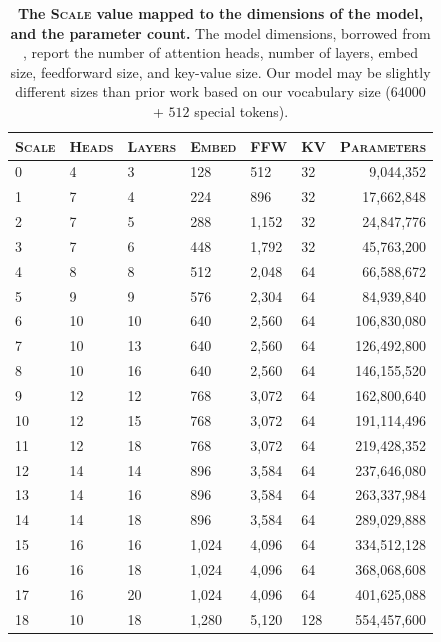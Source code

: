 \begin{table}
  \centering            %
  \scriptsize         %
  \setlength{\tabcolsep}{3pt}
\caption{\textbf{The \textsc{Scale} value mapped to the dimensions of the model, and the parameter count.}
The model dimensions, borrowed from \citet{muennighoff2024scaling}, report the number of attention heads, number of layers, embed size, feedforward size, and key-value size.
Our model may be slightly different sizes than prior work based on our vocabulary size ($64000$ + $512$ special tokens).
}
    \begin{tabular}{l|lllll|r}
      \toprule
      \textsc{Scale} & \textsc{Heads} & \textsc{Layers} & \textsc{Embed} & 
      \textsc{FFW} & \textsc{KV} & \textsc{Parameters}\\
      \midrule
0  & 4  & 3  & 128  & 512   & 32  & 9,044,352  \\
1  & 7  & 4  & 224  & 896   & 32  & 17,662,848 \\
2  & 7  & 5  & 288  & 1,152 & 32 & 24,847,776 \\
3  & 7  & 6  & 448  & 1,792 & 32 & 45,763,200 \\
4  & 8  & 8  & 512  & 2,048 & 64 & 66,588,672 \\
5  & 9  & 9  & 576  & 2,304 & 64 & 84,939,840 \\
6  & 10 & 10 & 640  & 2,560 & 64 & 106,830,080 \\
7  & 10 & 13 & 640  & 2,560 & 64 & 126,492,800 \\
8  & 10 & 16 & 640  & 2,560 & 64 & 146,155,520 \\
9  & 12 & 12 & 768  & 3,072 & 64 & 162,800,640 \\
10 & 12 & 15 & 768  & 3,072 & 64 & 191,114,496 \\
11 & 12 & 18 & 768  & 3,072 & 64 & 219,428,352 \\
12 & 14 & 14 & 896  & 3,584 & 64 & 237,646,080 \\
13 & 14 & 16 & 896  & 3,584 & 64 & 263,337,984 \\
14 & 14 & 18 & 896  & 3,584 & 64 & 289,029,888 \\
15 & 16 & 16 & 1,024 & 4,096 & 64 & 334,512,128 \\
16 & 16 & 18 & 1,024 & 4,096 & 64 & 368,068,608 \\
17 & 16 & 20 & 1,024 & 4,096 & 64 & 401,625,088 \\
18 & 10 & 18 & 1,280 & 5,120 & 128 & 554,457,600 \\

\end{tabular}
\end{table}
